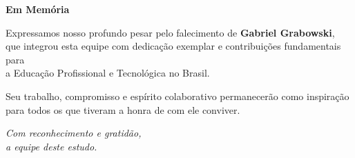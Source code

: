 \cleardoublepage
\thispagestyle{empty}

\vspace*{6cm}

\begin{center}
	{\LARGE \textbf{Em Memória}}
	
	\vspace{1cm}
	
	{\large
		Expressamos nosso profundo pesar pelo falecimento de \textbf{Gabriel Grabowski},\\
		que integrou esta equipe com dedicação exemplar e contribuições fundamentais para\\
		a Educação Profissional e Tecnológica no Brasil.
		
		\vspace{0.5cm}
		
		Seu trabalho, compromisso e espírito colaborativo permanecerão como inspiração\\
		para todos os que tiveram a honra de com ele conviver.
	}
	
	\vspace{1.5cm}
	
	{\normalsize
		\textit{Com reconhecimento e gratidão,\\
			a equipe deste estudo.}
	}
\end{center}
